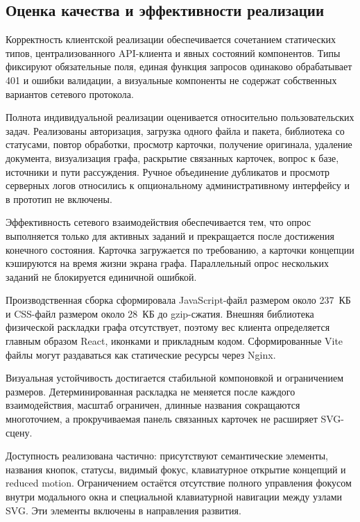 \subsection{Оценка качества и эффективности реализации}

Корректность клиентской реализации обеспечивается сочетанием статических типов, централизованного API-клиента и явных состояний компонентов. Типы фиксируют обязательные поля, единая функция запросов одинаково обрабатывает 401 и ошибки валидации, а визуальные компоненты не содержат собственных вариантов сетевого протокола.

Полнота индивидуальной реализации оценивается относительно пользовательских задач. Реализованы авторизация, загрузка одного файла и пакета, библиотека со статусами, повтор обработки, просмотр карточки, получение оригинала, удаление документа, визуализация графа, раскрытие связанных карточек, вопрос к базе, источники и пути рассуждения. Ручное объединение дубликатов и просмотр серверных логов относились к опциональному административному интерфейсу и в прототип не включены.

Эффективность сетевого взаимодействия обеспечивается тем, что опрос выполняется только для активных заданий и прекращается после достижения конечного состояния. Карточка загружается по требованию, а карточки концепции кэшируются на время жизни экрана графа. Параллельный опрос нескольких заданий не блокируется единичной ошибкой.

Производственная сборка сформировала JavaScript-файл размером около 237~КБ и CSS-файл размером около 28~КБ до gzip-сжатия. Внешняя библиотека физической раскладки графа отсутствует, поэтому вес клиента определяется главным образом React, иконками и прикладным кодом. Сформированные Vite файлы могут раздаваться как статические ресурсы через Nginx.

Визуальная устойчивость достигается стабильной компоновкой и ограничением размеров. Детерминированная раскладка не меняется после каждого взаимодействия, масштаб ограничен, длинные названия сокращаются многоточием, а прокручиваемая панель связанных карточек не расширяет SVG-сцену.

Доступность реализована частично: присутствуют семантические элементы, названия кнопок, статусы, видимый фокус, клавиатурное открытие концепций и reduced motion. Ограничением остаётся отсутствие полного управления фокусом внутри модального окна и специальной клавиатурной навигации между узлами SVG. Эти элементы включены в направления развития.

